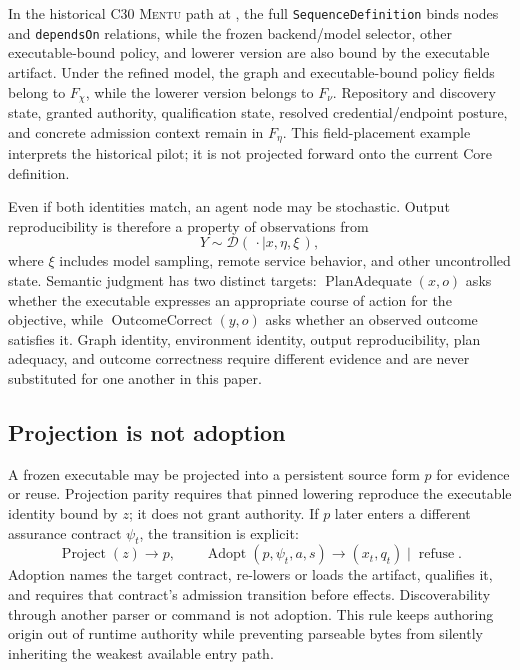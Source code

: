 \documentclass[11pt]{article}
\newcommand{\mentu}{\textsc{Mentu}}
\newcommand{\code}[1]{\texttt{#1}}
\begin{document}
In the historical C30 \mentu{} path at \code{\MentuCommitShort}, the full
\code{SequenceDefinition} binds nodes and \code{dependsOn} relations, while
the frozen backend/model selector, other executable-bound policy, and lowerer
version are also bound by the executable artifact. Under the refined model,
the graph and executable-bound policy fields belong to \(F_\chi\), while the
lowerer version belongs to \(F_\nu\). Repository and discovery state, granted
authority, qualification state, resolved credential/endpoint posture, and
concrete admission context remain in \(F_\eta\). This field-placement example
interprets the historical pilot; it is not projected forward onto the current
Core definition.

Even if both identities match, an agent node may be stochastic.  Output
reproducibility is therefore a property of observations from
\[
  Y \sim \mathcal{D}(\,\cdot \mid x,\eta,\xi\,),
\]
where \(\xi\) includes model sampling, remote service behavior, and other
uncontrolled state. Semantic judgment has two distinct targets:
\(\operatorname{PlanAdequate}(x,o)\) asks whether the executable expresses an
appropriate course of action for the objective, while
\(\operatorname{OutcomeCorrect}(y,o)\) asks whether an observed outcome
satisfies it. Graph identity, environment identity, output reproducibility,
plan adequacy, and outcome correctness require different evidence and are
never substituted for one another in this paper.

\subsection*{Projection is not adoption}

A frozen executable may be projected into a persistent source form \(p\) for
evidence or reuse. Projection parity requires that pinned lowering reproduce
the executable identity bound by \(z\); it does not grant authority. If \(p\)
later enters a different assurance contract \(\psi_t\), the transition is
explicit:
\[
\operatorname{Project}(z)\rightarrow p,\qquad
\operatorname{Adopt}(p,\psi_t,a,s)\rightarrow(x_t,q_t)\mid\operatorname{refuse}.
\]
Adoption names the target contract, re-lowers or loads the artifact, qualifies
it, and requires that contract's admission transition before effects.
Discoverability through another parser or command is not adoption. This rule
keeps authoring origin out of runtime authority while preventing parseable
bytes from silently inheriting the weakest available entry path.
\end{document}
